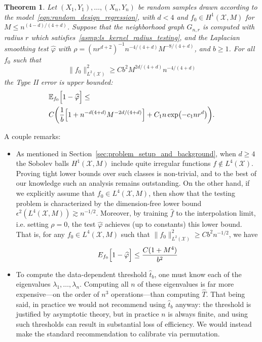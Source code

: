 \documentclass[twoside]{article}
\newcommand{\1}{\mathbf{1}}
\newcommand{\Xset}{\mathcal{X}}
\newcommand{\Leb}{L}
\newcommand{\Ebb}{\mathbb{E}}
\newcommand{\wh}[1]{\widehat{#1}}
\newtheorem{theorem}{Theorem}
\theoremstyle{definition}
\theoremstyle{remark}
\begin{document}
\begin{theorem}
	\label{thm:laplacian_smoothing_testing}
	Let $(X_1,Y_1),\ldots,(X_n,Y_n)$ be random samples drawn according to the model~\eqref{eqn:random_design_regression}, with $d < 4$ and $f_0 \in H^1(\Xset,M)$ for $M \leq n^{(4 - d)/(4 + d)}$. Suppose that the neighborhood graph $G_{n,r}$ is computed with radius $r$ which satisfies~\ref{asmp:ls_kernel_radius_testing}, and the Laplacian smoothing test $\wh{\varphi}$ with $\rho = (nr^{d + 2})^{-1} n^{-4/(4 + d)} M^{-8/(4 + d)}$, and $b \geq 1$. For all $f_0$ such that
	\begin{equation}
	\label{eqn:laplacian_smoothing_testing}
	\bigl\|f_0\bigr\|_{\Leb^2(\Xset)}^2 \geq C b^2 M^{2d/(4 + d)} n^{-4/(4 + d)}
	\end{equation} 
	the Type II error is upper bounded:
	\begin{align*}
	& \Ebb_{f_0}\Bigl[1 - \wh{\varphi} \Bigr] \leq \\
	& C\biggl(\frac{1}{b}\Bigl[1 + n^{-d(4 + d)}M^{-2d/(4 + d)}\Bigr] + C_1n\exp\bigl(-c_1nr^d\bigr)\biggr).
	\end{align*}
\end{theorem}
A couple remarks:
\begin{itemize}
	\item As mentioned in Section~\ref{sec:problem_setup_and_background}, when $d \geq 4$ the Sobolev balls $H^1(\Xset,M)$ include quite irregular functions $f \not\in \Leb^4(\Xset)$. Proving tight lower bounds over such classes is non-trivial, and to the best of our knowledge such an analysis remains outstanding. On the other hand, if we explicitly assume that $f_0 \in \Leb^4(\Xset,M)$, then \cite{guerre02} show that the testing problem is characterized by the dimension-free lower bound $\epsilon^{2}(\Leb^4(\Xset,M)) \gtrsim n^{-1/2}$. Moreover, by training $\wh{f}$ to the interpolation limit, i.e. setting $\rho = 0$, the test $\wh{\varphi}$ achieves (up to constants) this lower bound. That is, for any $f_0 \in \Leb^4(\Xset,M)$ such that $\|f_0\|_{\Leb^2(\Xset)}^2 \geq C b^2n^{-1/2}$, we have
	\begin{equation}
	\label{eqn:laplacian_smoothing_testing_low_smoothness}
	E_{f_0}\Bigl[1 - \wh{\varphi}\Bigr] \leq \frac{C(1 + M^4)}{b^2}
	\end{equation} 
	\item To compute the data-dependent threshold $\wh{t}_b$, one must know each of the eigenvalues $\lambda_1,\ldots,\lambda_n$. Computing all $n$ of these eigenvalues is far more expensive---on the order of $n^3$ operations---than computing $\wh{T}$. That being said, in practice we would not recommend using $\wh{t}_b$ anyway: the threshold is justified by asymptotic theory, but in practice $n$ is always finite, and using such thresholds can result in substantial loss of efficiency. We would instead make the standard recommendation to calibrate via permutation. 
\end{itemize}
\end{document}
